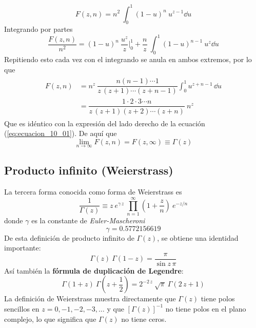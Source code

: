 \begin{equation}
F(z,n) = n^{2} \: \int_{0}^{1} (1-u)^{n} \: u^{z-1} \dd u
\label{eq:ecuacione_10_12}
\end{equation}
Integrando por partes
\begin{equation}
\dfrac{F(z, n)}{n^{2}} =  (1-u)^{n} \: \dfrac{u^{z}}{z} \Bigg\vert_{0}^{1} + \dfrac{n}{z} \: \int_{0}^{1} (1-u)^{n-1} \: u^{z} \dd u
\label{eq:ecuacion_10_13}
\end{equation}
Repitiendo esto cada vez con el integrando se anula en ambos extremos, por lo que
\begin{align}
\begin{aligned}
F(z,n) &= n^{z} \: \dfrac{n(n-1) \cdots 1}{z \, (z+1) \cdots (z+n-1)} \int_{0}^{1} u^{z+n-1} \, \dd u \\
&= \dfrac{1 \cdot 2 \cdot 3 \cdots n}{z \, (z+1)(z+2) \cdots (z+n)} \: n^{z}
\label{eq:ecuacion_10_14}
\end{aligned}
\end{align}
Que es idéntico con la expresión del lado derecho de la ecuación (\ref{eq:ecuacion_10_01}). De aquí que
\begin{equation}
\lim_{n \to \infty} F(z, n) = F(z, \infty) \equiv \Gamma (z)
\label{eq:ecuacion_10_15}
\end{equation}
\subsection{Producto infinito (Weierstrass)}
La tercera forma conocida como forma de Weierstrass es
\begin{equation}
\dfrac{1}{\Gamma (z)} \equiv z \:  e^{\gamma \, z} \: \prod_{n=1}^{\infty} \left( 1 + \dfrac{z}{n} \right) \: e^{-z/n}
\label{eq:ecuacion_10_16}
\end{equation}
donde $\gamma$ es la constante de \emph{Euler-Mascheroni}
\begin{equation}
\gamma = 0.5772156619
\label{eq:ecuacion_10_17}
\end{equation}
De esta definición de producto infinito de $\Gamma (z)$, se obtiene una identidad importante:
\begin{equation}
\Gamma (z) \: \Gamma (1 - z) = \dfrac{\pi}{\sin z \, \pi}
\label{eq:ecuacion_10_23}
\end{equation}
Así también la \textbf{fórmula de duplicación de Legendre}:
\begin{equation}
\Gamma (1 + z) \: \Gamma (z + \frac{1}{2}) = 2^{-2 \, z} \: \sqrt{\pi} \: \Gamma (2 \, z + 1)
\label{eq:ecuacion_10_24b}
\end{equation}
La definición de Weierstrass muestra directamente que $\Gamma (z)$ tiene polos sencillos en $z = 0, -1, -2, -3, \ldots$ y que $[\Gamma (z)]^{-1}$ no tiene polos en el plano complejo, lo que significa que $\Gamma (z)$ no tiene ceros.
